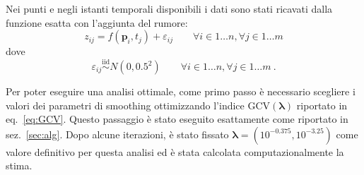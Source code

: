 \documentclass[a4paper,11pt,twoside,openright]{book}							%
\begin{document}
Nei punti e negli istanti temporali disponibili i dati sono stati ricavati dalla funzione esatta con l'aggiunta del rumore:
$$
z_{ij}=f(\bm p_{i},t_j) + \varepsilon_{ij} \qquad \forall i \in 1\ldots n, \forall j \in 1\ldots m
$$
dove
$$
\varepsilon_{ij}\stackrel{\mathrm{iid}}{\sim}N(0,0.5^2) \qquad \forall i \in 1\ldots n, \forall j \in 1\ldots m \ .
$$

Per poter eseguire una analisi ottimale, come primo passo è necessario scegliere i valori dei parametri di smoothing ottimizzando l'indice $\mathrm{GCV}(\bm \lambda)$ riportato in eq.~\eqref{eq:GCV}. Questo passaggio è stato eseguito esattamente come riportato in sez.~\ref{sec:alg}. Dopo alcune iterazioni, è stato fissato $\bm \lambda = (10^{-0.375}, 10^{-3.25})$ come valore definitivo per questa analisi ed è stata calcolata computazionalmente la stima.
\end{document}
